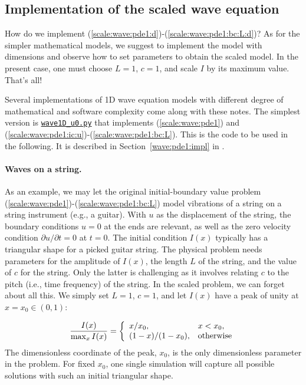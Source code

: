 \documentclass[graybox,envcountchap,sectrefs,final]{svmonodo}
\begin{document}
\subsection{Implementation of the scaled wave equation}
\label{sec:scale:wave:impl}

How do we implement (\ref{scale:wave:pde1:d})-(\ref{scale:wave:pde1:bc:L:d})?
As for the simpler mathematical models, we suggest to implement the model
with dimensions and observe how to set parameters to obtain the scaled
model. In the present case, one must choose $L=1$, $c=1$, and scale $I$ by its
maximum value. That's all!

Several implementations of 1D wave equation models with different
degree of mathematical and software complexity come along with these
notes. The simplest
version is \href{{http://tinyurl.com/o8pb3yy/wave1D_u0.py}}{\nolinkurl{wave1D_u0.py}}
that implements (\ref{scale:wave:pde1}) and
(\ref{scale:wave:pde1:ic:u})-(\ref{scale:wave:pde1:bc:L}).
This is the code to be used in the following. It is described
in Section~\ref{wave:pde1:impl} in \cite{Langtangen_Linge_fdm}.


\paragraph{Waves on a string.}
As an example, we may let the original initial-boundary value problem
(\ref{scale:wave:pde1})-(\ref{scale:wave:pde1:bc:L}) model vibrations of
a string on a string instrument (e.g., a guitar).
With $u$ as the displacement of the
string, the boundary conditions $u=0$ at the ends are relevant, as
well as the zero velocity condition $\partial u/\partial t=0$ at
$t=0$.  The initial condition $I(x)$ typically has a triangular shape
for a picked guitar string.  The physical problem needs parameters for
the amplitude of $I(x)$, the length $L$ of the string, and the value
of $c$ for the string. Only the latter is challenging as it involves
relating $c$ to the pitch (i.e., time frequency) of the string. In the
scaled problem, we can forget about all this. We simply set $L=1$,
$c=1$, and let $I(x)$ have a peak of unity at $x=x_0\in(0,1)$:

\[
\frac{I(x)}{\max_x I(x)} = \left\lbrace
\begin{array}{ll}
x/x_0, & x < x_0,\\ 
(1-x)/(1-x_0), & \hbox{otherwise}
\end{array}\right.
\]
The dimensionless coordinate of the peak, $x_0$, is the only
dimensionless parameter in the problem. For fixed $x_0$,
one single simulation will capture all possible solutions with such
an initial triangular shape.
\end{document}
